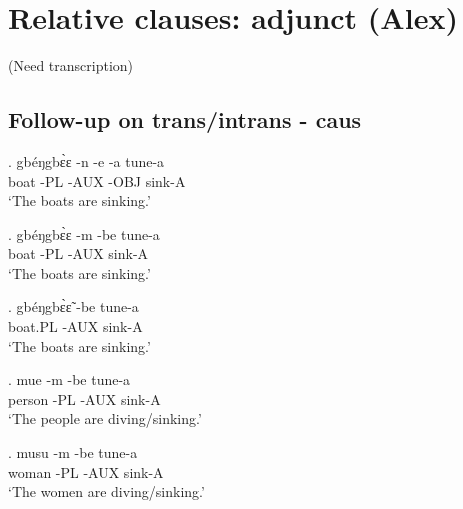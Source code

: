 \documentclass{assets/fieldnotes}
\begin{document}
{\noindent{\rule{\textwidth}{1pt}}



\section{Relative clauses: adjunct (Alex)} 
(Need transcription)

\subsection*{Follow-up on trans/intrans - caus}


\exg.
gbéŋgbɛ̀ɛ   -n    -e     -a     tune-a \\
boat       -PL   -AUX   -OBJ   sink-A \\
`The boats are sinking.' \label{The boats are sinking - obj marker}


\exg.
gbéŋgbɛ̀ɛ   -m    -be    tune-a \\
boat       -PL   -AUX   sink-A \\
`The boats are sinking.' \label{The boats are sinking - no obj marker}


\exg.
gbéŋgbɛ̀ɛ̃   -be    tune-a \\
boat.PL    -AUX   sink-A \\
`The boats are sinking.' \label{The boats are sinking - slow}

\exg.
mue     -m    -be    tune-a \\
person   -PL   -AUX   sink-A \\%
`The people are diving/sinking.'

\exg.
musu    -m    -be    tune-a \\
woman   -PL   -AUX   sink-A \\%
`The women are diving/sinking.' \label{The women are diving - no little v}


}
\end{document}
